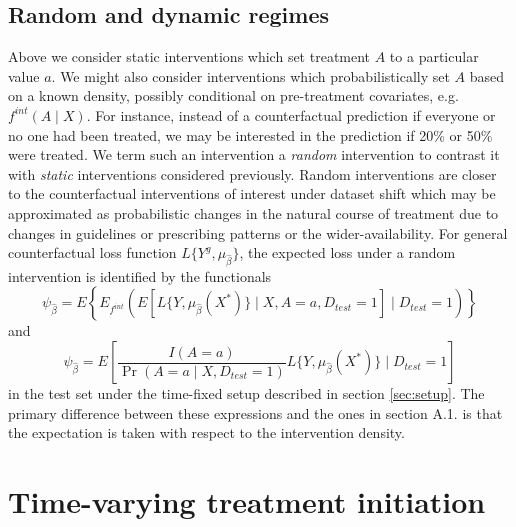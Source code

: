     \subsection{Random and dynamic regimes}
    Above we consider static interventions which set treatment $A$ to a particular value $a$. We might also consider interventions which probabilistically set $A$ based on a known density, possibly conditional on pre-treatment covariates, e.g. $f^{int}(A \mid X)$. For instance, instead of a counterfactual prediction if everyone or no one had been treated, we may be interested in the prediction if 20\% or 50\% were treated. We term such an intervention a \textit{random} intervention to contrast it with \textit{static} interventions considered previously. Random interventions are closer to the counterfactual interventions of interest under dataset shift which may be approximated as probabilistic changes in the natural course of treatment due to changes in guidelines or prescribing patterns or the wider-availability. For general counterfactual loss function $L\{Y^{g}, \mu_{\widehat{\beta}}\}$, the expected loss under a random intervention is identified by the functionals
    \begin{equation}\label{eqn:rand_cl_estimand}
        \psi_{\widehat{\beta}} = E\left\{E_{f^{int}}\left(E[L\{Y, \mu_{\widehat{\beta}}(X^*)\} \mid X, A=a, D_{test} = 1] \mid D_{test} = 1\right)\right\}
    \end{equation}
    and 
    \begin{equation}\label{eqn:rand_ipw_estimand}
        \psi_{\widehat{\beta}} = E\left[\frac{I(A = a)}{\Pr(A = a \mid X, D_{test} = 1)}L\{Y, \mu_{\widehat{\beta}}(X^*)\} \mid D_{test} = 1\right]
    \end{equation}
    in the test set under the time-fixed setup described in section \ref{sec:setup}. The primary difference between these expressions and the ones in section A.1. is that the expectation is taken with respect to the intervention density. 


\section{Time-varying treatment initiation}\label{sec:timevarying}
